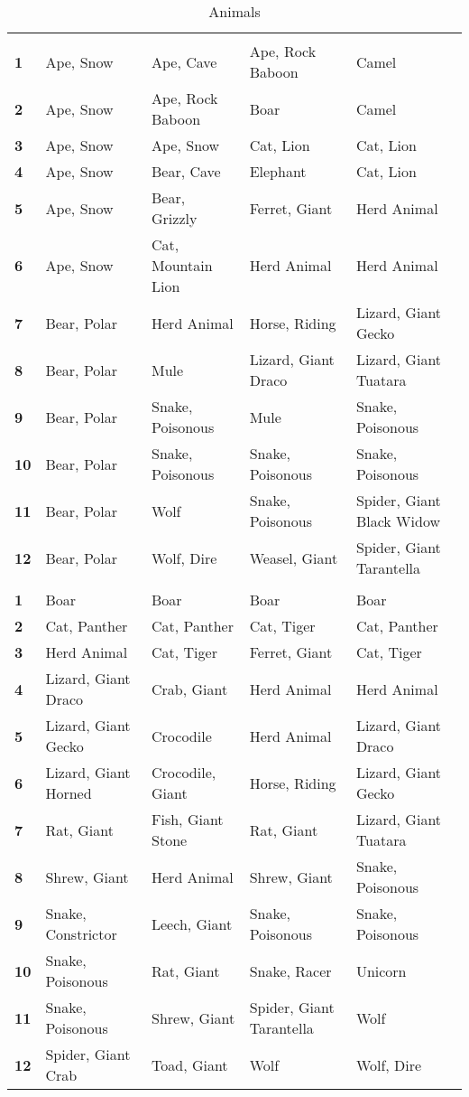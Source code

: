 \begin {table}[H]
  \caption{Animals}
  \begin{tabularx}{\columnwidth}{>{\bfseries}YYYYY}
	 &  &  &  & \\
	1 & Ape, Snow & Ape, Cave & Ape, Rock Baboon & Camel\\
	2 & Ape, Snow & Ape, Rock Baboon & Boar & Camel\\
	3 & Ape, Snow & Ape, Snow & Cat, Lion & Cat, Lion\\
	4 & Ape, Snow & Bear, Cave & Elephant & Cat, Lion\\
	5 & Ape, Snow & Bear, Grizzly & Ferret, Giant & Herd Animal\\
	6 & Ape, Snow & Cat, Mountain Lion & Herd Animal & Herd Animal\\
	7 & Bear, Polar & Herd Animal & Horse, Riding & Lizard, Giant Gecko\\
	8 & Bear, Polar & Mule & Lizard, Giant Draco & Lizard, Giant Tuatara\\
	9 & Bear, Polar & Snake, Poisonous & Mule & Snake, Poisonous\\
	10 & Bear, Polar & Snake, Poisonous & Snake, Poisonous & Snake, Poisonous\\
	11 & Bear, Polar & Wolf & Snake, Poisonous & Spider, Giant Black Widow\\
	12 & Bear, Polar & Wolf, Dire & Weasel, Giant & Spider, Giant Tarantella\\
	 &  &  &  & \\
	1 & Boar & Boar & Boar & Boar\\
	2 & Cat, Panther & Cat, Panther & Cat, Tiger & Cat, Panther\\
	3 & Herd Animal & Cat, Tiger & Ferret, Giant & Cat, Tiger\\
	4 & Lizard, Giant Draco & Crab, Giant & Herd Animal & Herd Animal\\
	5 & Lizard, Giant Gecko & Crocodile & Herd Animal & Lizard, Giant Draco\\
	6 & Lizard, Giant Horned & Crocodile, Giant & Horse, Riding & Lizard, Giant Gecko\\
	7 & Rat, Giant & Fish, Giant Stone & Rat, Giant & Lizard, Giant Tuatara\\
	8 & Shrew, Giant & Herd Animal & Shrew, Giant & Snake, Poisonous\\
	9 & Snake, Constrictor & Leech, Giant & Snake, Poisonous & Snake, Poisonous\\
	10 & Snake, Poisonous & Rat, Giant & Snake, Racer & Unicorn\\
	11 & Snake, Poisonous & Shrew, Giant & Spider, Giant Tarantella & Wolf\\
	12 & Spider, Giant Crab & Toad, Giant & Wolf & Wolf, Dire
  \end {tabularx}
\end {table}

